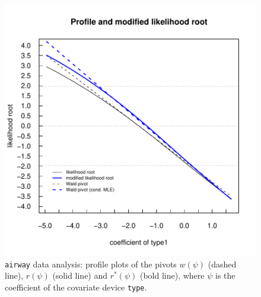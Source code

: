 \documentclass[a4paper,11pt]{article}
\def\code{\texttt}
\begin{document}
\begin{figure}[tph]
\includegraphics{Rnews-paper-009}
\caption{
\code{airway} data analysis: profile plots of the pivots $w(\psi)$ (dashed line), $r(\psi)$ (solid line) and $r^*(\psi)$ (bold line), where $\psi$ is the coefficient of the covariate device \code{type}.}
\label{fig:pivot.airway}
\end{figure}
\end{document}
